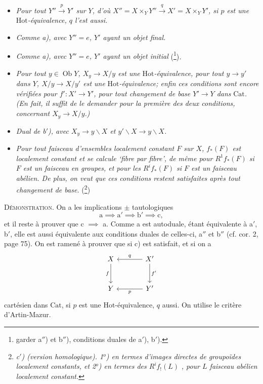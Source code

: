 \documentclass[11pt]{article}
\newcommand{\printedpage}[1]{\marginpar{\footnotesize p.~#1}}
\newcommand{\Hot}{\mathrm{Hot}}
\newcommand{\Cat}{\mathrm{Cat}}
\newcommand{\Ob}{\operatorname{Ob}}
\begin{document}
\begin{itemize}[leftmargin=3em]
\item[\textit{a)}] \textit{Pour tout $Y'' \xrightarrow{p} Y'$ sur $Y$, d'où $X'' = X \times_Y Y'' \xrightarrow{q} X' = X \times_Y Y'$, si $p$ est une} $\Hot$\textit{-équivalence, $q$ l'est aussi.}

\item[\textit{a$'$)}] \textit{Comme a), avec $Y'' = e$, $Y'$ ayant un objet final.}

\item[\textit{a$''$)}] \textit{Comme a), avec $Y'' = e$, $Y'$ ayant un objet initial} (\footnote{garder a$''$) et b$''$), conditions duales de a$'$), b$'$).})\textit{.}

\item[\textit{b$'$)}] \textit{Pour tout $y \in \Ob Y$, $X_y \longrightarrow X/y$ est une} $\Hot$\textit{-équivalence, pour tout $y \longrightarrow y'$ dans $Y$, $X/y \longrightarrow X/y'$ est une} $\Hot$\textit{-équivalence; enfin ces conditions sont encore vérifiées pour $f' : X' \longrightarrow Y'$, pour tout changement de base $Y' \longrightarrow Y$ dans} $\Cat$\textit{. (En fait, il suffit de le demander pour la première des deux conditions, concernant $X_y \longrightarrow X/y$.)}

\item[\textit{b$''$)}] \textit{Dual de b$'$), avec $X_y \longrightarrow y\backslash X$ et $y'\backslash X \longrightarrow y\backslash X$.}

\item[\textit{c)}] \textit{Pour tout faisceau d'ensembles localement constant $F$ sur $X$, $f_*(F)$ est localement constant et se calcule `fibre par fibre', de même pour $R^1 f_*(F)$ si $F$ est un faisceau en groupes, et pour les $R^i f_*(F)$ si $F$ est un faisceau abélien. De plus, on veut que ces conditions restent satisfaites après tout changement de base.} (\footnote{\textit{c$'$) (version homologique). 1$^o$) en termes d'images directes de groupoïdes localement constants, et 2$^o$) en termes des $R^i f_!(L)$} \textit{, pour $L$ faisceau abélien localement constant.}})
\end{itemize}

\noindent\textsc{Démonstration}. On a les implications $\pm$ tautologiques
\[
\mathrm{a} \implies \mathrm{a}' \implies \mathrm{b}' \implies \mathrm{c},
\]
et il reste à prouver que c $\implies$ a. Comme a est autoduale, étant équivalente à a$'$, b$'$, elle est aussi équivalente aux conditions duales de celles-ci, a$''$ et b$''$ (cf. cor. 2, page 75). On est ramené à prouver que si c) est satisfait, et si on a
\[
\begin{tikzcd}[row sep=large, column sep=large]
X \arrow[d, "f"'] & X' \arrow[l, "q"'] \arrow[d, "f'"] \\
Y & Y' \arrow[l, "p"]
\end{tikzcd}
\]
\printedpage{2}
cartésien dans $\Cat$, si $p$ est une $\Hot$-équivalence, $q$ aussi. On utilise le critère d'Artin-Mazur.
\end{document}
